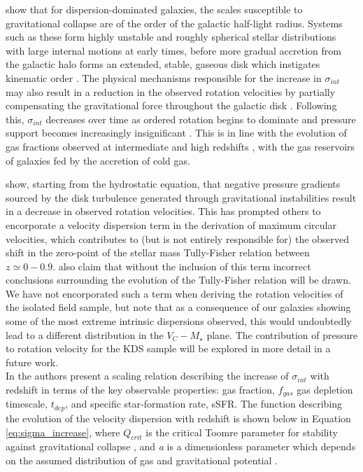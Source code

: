 \documentclass[fleqn,usenatbib]{mnras}
\begin{document}
\cite{Genzel2011} show that for dispersion-dominated galaxies, the scales susceptible to gravitational collapse are of the order of the galactic half-light radius. 
Systems such as these form highly unstable and roughly spherical stellar distributions with large internal motions at early times, before more gradual accretion from the galactic halo forms an extended, stable, gaseous disk which instigates kinematic order \citep{Law2009,Genzel2011}.
The physical mechanisms responsible for the increase in $\sigma_{int}$ may also result in a reduction in the observed rotation velocities by partially compensating the gravitational force throughout the galactic disk \citep[e.g.][]{Burkert2010,Wuyts2016b,Ubler2017,Genzel2017,Lang2017}.
Following this, $\sigma_{int}$ decreases over time as ordered rotation begins to dominate and pressure support becomes increasingly insignificant \citep[e.g.][]{Burkert2010,Ubler2017,Genzel2017,Lang2017}.
This is in line with the evolution of gas fractions observed at intermediate and high redshifts \citep[e.g.][]{Saintonge2013,Tacconi2013,Tacconi2017}, with the gas reservoirs of galaxies fed by the accretion of cold gas.

\cite{Burkert2010} show, starting from the hydrostatic equation, that negative pressure gradients sourced by the disk turbulence generated through gravitational instabilities result in a decrease in observed rotation velocities. 
This has prompted others \citep[e.g.][]{Wuyts2016b,Ubler2017,Lang2017} to encorporate a velocity dispersion term in the derivation of maximum circular velocities, which contributes to (but is not entirely responsible for) the observed shift in the zero-point of the stellar mass Tully-Fisher relation between $z\simeq0-0.9$.
\cite{Ubler2017} also claim that without the inclusion of this term incorrect conclusions surrounding the evolution of the Tully-Fisher relation will be drawn.
We have not encorporated such a term when deriving the rotation velocities of the isolated field sample, but note that as a consequence of our galaxies showing some of the most extreme intrinsic dispersions observed, this would undoubtedly lead to a different distribution in the $V_{C}-M_{\star}$ plane.
The contribution of pressure to rotation velocity for the KDS sample will be explored in more detail in a future work. 
\\

\noindent
In \cite{Wisnioski2015} the authors present a scaling relation describing the increase of $\sigma_{int}$ with redshift in terms of the key observable properties: gas fraction, $f_{gas}$ gas depletion timescale, $t_{dep}$, and specific star-formation rate, sSFR.
The function describing the evolution of the velocity dispersion with redshift is shown below in Equation \ref{eq:sigma_increase}, where $Q_{crit}$ is the critical Toomre parameter for stability against gravitational collapse \citep{Toomre1964}, and {\it a} is a dimensionless parameter which depends on the assumed distribution of gas and gravitational potential \cite{ForsterSchreiber2006}. 
\end{document}
